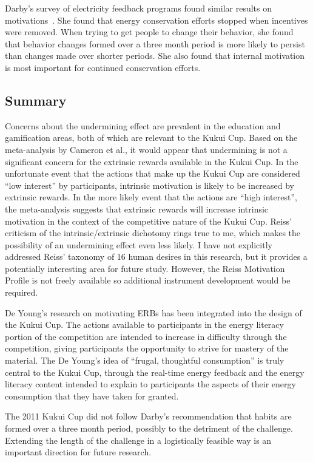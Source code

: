 Darby's survey of electricity feedback programs found similar results on motivations~\cite{darby-review-2006}. She found that energy conservation efforts stopped when incentives were removed. When trying to get people to change their behavior, she found that behavior changes formed over a three month period is more likely to persist than changes made over shorter periods. She also found that internal motivation is most important for continued conservation efforts.


\subsection{Summary}

Concerns about the undermining effect are prevalent in the education and gamification areas, both of which are relevant to the Kukui Cup. Based on the meta-analysis by Cameron et al., it would appear that undermining is not a significant concern for the extrinsic rewards available in the Kukui Cup. In the unfortunate event that the actions that make up the Kukui Cup are considered ``low interest'' by participants, intrinsic motivation is likely to be increased by extrinsic rewards. In the more likely event that the actions are ``high interest'', the meta-analysis suggests that extrinsic rewards will increase intrinsic motivation in the context of the competitive nature of the Kukui Cup. Reiss' criticism of the intrinsic/extrinsic dichotomy rings true to me, which makes the possibility of an undermining effect even less likely. I have not explicitly addressed Reiss' taxonomy of 16 human desires in this research, but it provides a potentially interesting area for future study. However, the Reiss Motivation Profile is not freely available so additional instrument development would be required.

De Young's research on motivating ERBs has been integrated into the design of the Kukui Cup. The actions available to participants in the energy literacy portion of the competition are intended to increase in difficulty through the competition, giving participants the opportunity to strive for mastery of the material. The De Young's idea of ``frugal, thoughtful consumption'' is truly central to the Kukui Cup, through the real-time energy feedback and the energy literacy content intended to explain to participants the aspects of their energy consumption that they have taken for granted.

The 2011 Kukui Cup did not follow Darby's recommendation that habits are formed over a three month period, possibly to the detriment of the challenge. Extending the length of the challenge in a logistically feasible way is an important direction for future research.


